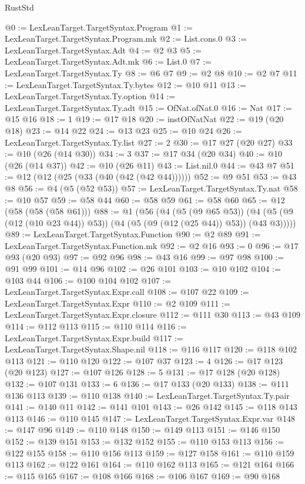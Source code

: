 \begin{lexlean}{RustStd}
\begin{coremodule}
{\begin{coremodule}
{{{{{{{{{{{{{{{{{{{{{{{{{{{{{{{{{{{{{{{{{{{{{@0 := LexLeanTarget.TargetSyntax.Program
@1 := LexLeanTarget.TargetSyntax.Program.mk
@2 := List.cons.{0}
@3 := LexLeanTarget.TargetSyntax.Adt
@4 := @2 @3
@5 := LexLeanTarget.TargetSyntax.Adt.mk
@6 := List.{0}
@7 := LexLeanTarget.TargetSyntax.Ty
@8 := @6 @7
@9 := @2 @8
@10 := @2 @7
@11 := LexLeanTarget.TargetSyntax.Ty.bytes
@12 := @10 @11
@13 := LexLeanTarget.TargetSyntax.Ty.option
@14 := LexLeanTarget.TargetSyntax.Ty.adt
@15 := OfNat.ofNat.{0}
@16 := Nat
@17 := @15 @16
@18 := 1
@19 := @17 @18
@20 := instOfNatNat
@22 := @19 (@20 @18)
@23 := @14 @22
@24 := @13 @23
@25 := @10 @24
@26 := LexLeanTarget.TargetSyntax.Ty.list
@27 := 2
@30 := @17 @27 (@20 @27)
@33 := @10 (@26 (@14 @30))
@34 := 3
@37 := @17 @34 (@20 @34)
@40 := @10 (@26 (@14 @37))
@42 := @10 (@26 @11)
@43 := List.nil.{0}
@44 := @43 @7
@51 := @12 (@12 (@25 (@33 (@40 (@42 (@42 @44))))))
@52 := @9 @51
@53 := @43 @8
@56 := @4 (@5 (@52 @53))
@57 := LexLeanTarget.TargetSyntax.Ty.nat
@58 := @10 @57
@59 := @58 @44
@60 := @58 @59
@61 := @58 @60
@65 := @12 (@58 (@58 (@58 @61)))
@88 := @1
    (@56
      (@4
        (@5 (@9 @65 @53))
        (@4 (@5 (@9 (@12 (@10 @23 @44)) @53)) (@4 (@5 (@9 (@12 (@25 @44)) @53)) (@43 @3)))))
@89 := LexLeanTarget.TargetSyntax.Function
@90 := @2 @89
@91 := LexLeanTarget.TargetSyntax.Function.mk
@92 := @2 @16
@93 := 0
@96 := @17 @93 (@20 @93)
@97 := @92 @96
@98 := @43 @16
@99 := @97 @98
@100 := @91 @99
@101 := @14 @96
@102 := @26 @101
@103 := @10 @102
@104 := @103 @44
@106 := @100 @104 @102
@107 := LexLeanTarget.TargetSyntax.Expr.call
@108 := @107 @22
@109 := LexLeanTarget.TargetSyntax.Expr
@110 := @2 @109
@111 := LexLeanTarget.TargetSyntax.Expr.closure
@112 := @111 @30
@113 := @43 @109
@114 := @112 @113
@115 := @110 @114
@116 := LexLeanTarget.TargetSyntax.Expr.build
@117 := LexLeanTarget.TargetSyntax.Shape.nil
@118 := @116 @117
@120 := @118 @102 @113
@121 := @110 @120
@122 := @107 @37
@123 := 4
@126 := @17 @123 (@20 @123)
@127 := @107 @126
@128 := 5
@131 := @17 @128 (@20 @128)
@132 := @107 @131
@133 := 6
@136 := @17 @133 (@20 @133)
@138 := @111 @136 @113
@139 := @110 @138
@140 := LexLeanTarget.TargetSyntax.Ty.pair
@141 := @140 @11
@142 := @141 @101
@143 := @26 @142
@145 := @118 @143 @113
@146 := @110 @145
@147 := LexLeanTarget.TargetSyntax.Expr.var
@148 := @147 @96
@149 := @110 @148
@150 := @149 @113
@151 := @146 @150
@152 := @139 @151
@153 := @132 @152
@155 := @110 @153 @113
@156 := @122 @155
@158 := @110 @156 @113
@159 := @127 @158
@161 := @110 @159 @113
@162 := @122 @161
@164 := @110 @162 @113
@165 := @121 @164
@166 := @115 @165
@167 := @108 @166
@168 := @106 @167
@169 := @90 @168
}}}}}}}}}}}}}}}}}}}}}}}}}}}}}}}}}}}}}}}}}}}}}
\end{coremodule}}
\end{coremodule}
\end{lexlean}
